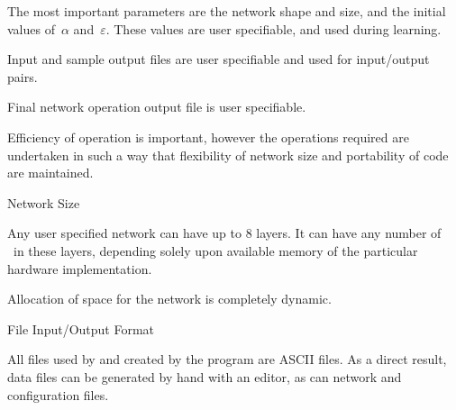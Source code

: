 The most important parameters are the network shape and size,
and the initial values of~$\alpha$ and~$\varepsilon$.
These values are user specifiable, and used during learning.

Input and sample output files are user specifiable and used for
input/output pairs.

Final network operation output file is user specifiable.

Efficiency of operation is important, however the operations required
are undertaken in such a way that flexibility of network size and
portability of code are maintained.

\sec Network Size

Any user specified network can have up to $8$ layers.
It can have any number of \neus\ in these layers, depending solely upon
available memory of the particular hardware implementation.

Allocation of space for the network is completely dynamic.

\sec File Input/Output Format

All files used by and created by the program are ASCII files.
As a direct result, data files can be generated by hand with an
editor, as can network and configuration files.
